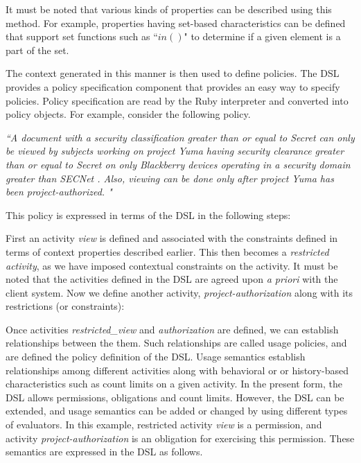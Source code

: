 It must be noted that various kinds of properties can be described using this method. For example, properties having set-based characteristics can be defined that support set functions such as ``$in()$" to determine if a given element is a part of the set. 

The context generated in this manner is then used to define policies. The DSL provides a policy specification component that provides an easy way to specify policies. Policy specification are read by the Ruby interpreter and converted into policy objects. For example, consider the following policy. 

{\em ``A document with a security classification greater than or equal to Secret can only be viewed by subjects working on project Yuma having security clearance greater than or equal to Secret on only Blackberry devices operating in a security domain greater than SECNet . Also, viewing can be done only after project Yuma has been project-authorized. "}

This policy is expressed in terms of the DSL in the following steps: 



First an activity {\em view} is defined and associated with the constraints defined in terms of context properties described earlier.  This then becomes a {\em restricted activity}, as we have imposed contextual constraints on the activity.  It must be noted that the activities defined in the DSL are agreed upon {\em a priori} with the client system. Now we define another activity, {\em project-authorization} along with its restrictions (or constraints):



Once activities {\em restricted\_view} and {\em authorization} are defined, we can establish relationships between the them. Such relationships are called usage policies, and are defined the policy definition of the DSL. Usage semantics establish relationships among different activities along with behavioral or or history-based characteristics such as count limits on a given activity. In the present form, the DSL allows permissions, obligations and count limits. However, the DSL can be extended, and usage semantics can be added or changed by using different types of evaluators. In this example, restricted activity {\em view} is a permission, and activity {\em project-authorization} is an obligation for exercising this permission. These semantics are expressed in the DSL as follows. 

